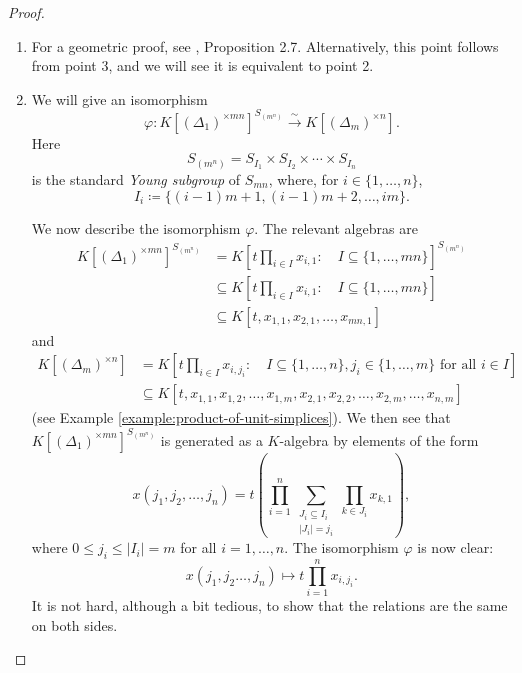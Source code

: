 \documentclass[a4paper,12pt]{amsart}
\theoremstyle{plain}
\theoremstyle{definition}
\theoremstyle{remark}
\begin{document}
\begin{proof}
\hfill
    \begin{enumerate}
        \item For a geometric proof, see \cite{adeyemo-szendroi-refined}, Proposition 2.7. Alternatively, this point follows from point 3, and we will see it is equivalent to point 2.
        
        \item We will give an isomorphism
        \[
        \varphi: K[(\Delta_1)^{\times mn}]^{S_{(m^n)}} \xrightarrow{\sim} K[(\Delta_m)^{\times n}].
        \]
        Here
        \[
        S_{(m^n)} = S_{I_1} \times S_{I_2} \times \cdots \times S_{I_n}
        \]
        is the standard \emph{Young subgroup} of $S_{mn}$, where, for $i \in \{1, \ldots, n\}$,
        \[
        I_i \coloneq \{(i - 1)m+1, (i - 1)m + 2, \ldots, im\}.
        \]
        
        We now describe the isomorphism $\varphi$. The relevant algebras are
        \begin{align*}
            K[(\Delta_1)^{\times mn}]^{S_{(m^n)}} &= K\left [t\prod_{i \in I}x_{i, 1}: \quad I \subseteq \{1,\dots,mn\} \right]^{S_{(m^n)}} \\
            &\subseteq K\left [t\prod_{i \in I}x_{i, 1}: \quad I \subseteq \{1,\dots,mn\} \right] \\
            &\subseteq K[t, x_{1,1},x_{2,1},\ldots,x_{mn, 1}]
        \end{align*}
        and
        \begin{align*}
        K[(\Delta_m)^{\times n}] &= K \left [ t \prod_{i \in I} x_{i, j_i}: \quad I \subseteq \{1, \ldots, n\}, j_i \in \{1, \ldots, m\} \text{ for all } i \in I \right ] \\
        &\subseteq K[t,x_{1, 1},x_{1,2},\ldots,x_{1,m},x_{2,1},x_{2,2},\ldots,x_{2,m},\ldots,x_{n,m}]
        \end{align*}
        (see Example \ref{example:product-of-unit-simplices}). We then see that $K[(\Delta_1)^{\times mn}]^{S_{(m^n)}}$ is generated as a $K$-algebra by elements of the form
        \[
        x(j_1, j_2, \ldots, j_n) = t\left ( \prod_{i = 1}^n\sum_{\substack{J_i \subseteq I_i\\|J_i| = j_i}}\prod_{k \in J_i} x_{k,1} \right ),
        \]
        where $0 \leq j_i \leq |I_i| = m$ for all $i = 1, \ldots, n$. The isomorphism $\varphi$ is now clear:
        \[
        x(j_1, j_2 \ldots, j_n) \mapsto t\prod_{i = 1}^nx_{i,j_i}.
        \]
        It is not hard, although a bit tedious, to show that the relations are the same on both sides. 
        

\end{enumerate}
\end{proof}
\end{document}
